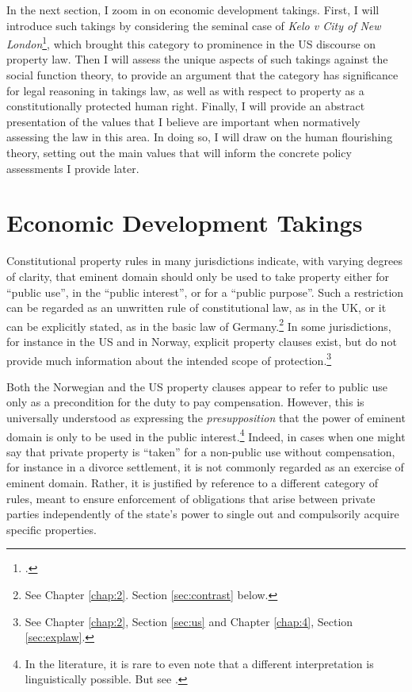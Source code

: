 In the next section, I zoom in on economic development takings. First, I will introduce such takings by considering the seminal case of {\it Kelo v City of New London}\footcite{kelo05}, which brought this category to prominence in the US discourse on property law. Then I will assess the unique aspects of such takings against the social function theory, to provide an argument that the category has significance for legal reasoning in takings law, as well as with respect to property as a constitutionally protected human right. Finally, I will provide an abstract presentation of the values that I believe are important when normatively assessing the law in this area. In doing so, I will draw on the human flourishing theory, setting out the main values that will inform the concrete policy assessments I provide later. 

\section{Economic Development Takings}\label{sec:edt}

Constitutional property rules in many jurisdictions indicate, with varying degrees of clarity, that eminent domain should only be used to take property either for ``public use'', in the ``public interest'', or for a ``public purpose''. Such a restriction can be regarded as an unwritten rule of constitutional law, as in the UK, or it can be explicitly stated, as in the basic law of Germany.\footnote{See Chapter \ref{chap:2}. Section \ref{sec:contrast} below.} In some jurisdictions, for instance in the US and in Norway, explicit property clauses exist, but do not provide much information about the intended scope of protection.\footnote{See Chapter \ref{chap:2}, Section \ref{sec:us} and Chapter \ref{chap:4}, Section \ref{sec:explaw}.}

Both the Norwegian and the US property clauses appear to refer to public use only as a precondition for the duty to pay compensation. However, this is universally understood as expressing the {\it presupposition} that the power of eminent domain is only to be used in the public interest.\footnote{In the literature, it is rare to even note that a different interpretation is linguistically possible. But see \cite[205]{berger78}.} Indeed, in cases when one might say that private property is ``taken'' for a non-public use without compensation, for instance in a divorce settlement, it is not commonly regarded as an exercise of eminent domain. Rather, it is justified by reference to a different category of rules, meant to ensure enforcement of obligations that arise between private parties independently of the state's power to single out and compulsorily acquire specific properties.

